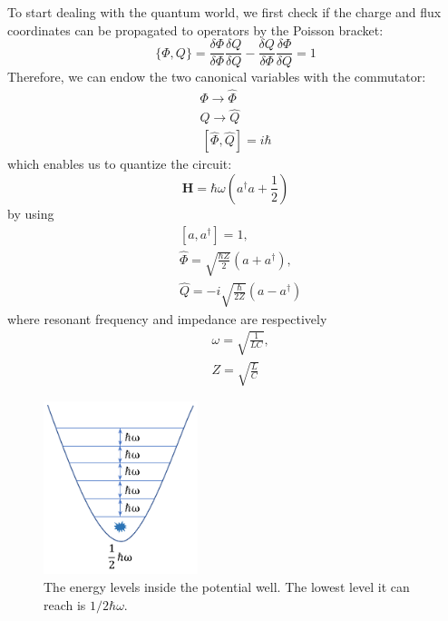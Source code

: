 To start dealing with the quantum world, we first check if the charge and flux coordinates can be propagated to operators by the Poisson bracket:
\begin{equation}
    \{\Phi, Q\} = \frac{\delta\Phi}{\delta\Phi}\frac{\delta Q}{\delta Q} - \frac{\delta Q}{\delta \Phi}\frac{\delta \Phi}{\delta Q} = 1
\end{equation}
Therefore, we can endow the two canonical variables with the commutator\cite{RN3}:
\begin{equation}
    \begin{array}{l}
    \Phi \to \hat\Phi \\
    Q \to \hat Q \\
    \, [ \hat\Phi, \hat Q ]  = i\hbar
    \end{array}
\end{equation}
which enables us to quantize the circuit:
\begin{equation}
    \mathbf{H} = \hbar\omega(a^\dagger a + \frac{1}{2})
\end{equation}
by using
\begin{equation}\label{chargeladder}
\begin{array}{cc}
     &   [a, a^\dagger] = 1, \\
     & \hat{\Phi} = \sqrt{\frac{\hbar Z}{2}}(a + a^\dagger), \\
     &  \hat{Q} = -i\sqrt{\frac{\hbar}{2Z}}(a - a^\dagger)
\end{array}
\end{equation}
where resonant frequency and impedance are respectively 
\begin{equation}
    \begin{array}{cc}
         &  \omega = \sqrt{\frac{1}{LC}},\\
         &  Z = \sqrt{\frac{L}{C}}
    \end{array}
\end{equation}

\begin{figure}[h!]
    \centering
    \includegraphics[width=0.4\textwidth]{Pic/QHO.png}
    \caption{The energy levels inside the potential well. The lowest level it can reach is $1/2\hbar\omega$.}
    \label{fig:my_label}
\end{figure}

